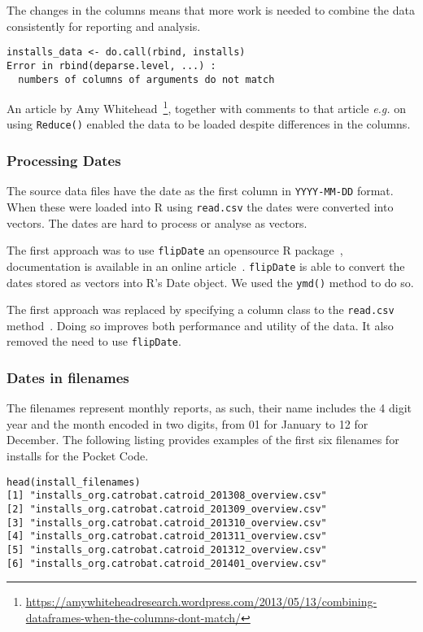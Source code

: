 The changes in the columns means that more work is needed to combine the data consistently for reporting and analysis. 

\begin{lstlisting}
installs_data <- do.call(rbind, installs)
Error in rbind(deparse.level, ...) : 
  numbers of columns of arguments do not match
\end{lstlisting}

An article by Amy Whitehead~\footnote{\url{https://amywhiteheadresearch.wordpress.com/2013/05/13/combining-dataframes-when-the-columns-dont-match/}}, together with comments to that article \emph{e.g.} on using \texttt{Reduce()} enabled the data to be loaded despite differences in the columns.

\subsubsection{Processing Dates}
The source data files have the date as the first column in \texttt{YYYY-MM-DD} format. When these were loaded into R using \texttt{read.csv} the dates were converted into vectors. The dates are hard to process or analyse as vectors. 

The first approach was to use \texttt{flipDate} an opensource R package~\cite{r_date_conversion_github}, documentation is available in an online article~\cite{r_date_conversion_article}. \texttt{flipDate} is able to convert the dates stored as vectors into R's Date object. We used the \texttt{ymd()} method to do so.

The first approach was replaced by specifying a column class to the \texttt{read.csv} method~\cite{r_bloggers_using_colclasses}. Doing so improves both performance and utility of the data. It also removed the need to use \texttt{flipDate}.

\subsubsection{Dates in filenames}
The filenames represent monthly reports, as such, their name includes the 4 digit year and the month encoded in two digits, from 01 for January to 12 for December. The following listing provides examples of the first six filenames for installs for the Pocket Code.

\begin{lstlisting}
head(install_filenames)
[1] "installs_org.catrobat.catroid_201308_overview.csv"
[2] "installs_org.catrobat.catroid_201309_overview.csv"
[3] "installs_org.catrobat.catroid_201310_overview.csv"
[4] "installs_org.catrobat.catroid_201311_overview.csv"
[5] "installs_org.catrobat.catroid_201312_overview.csv"
[6] "installs_org.catrobat.catroid_201401_overview.csv"
\end{lstlisting}

